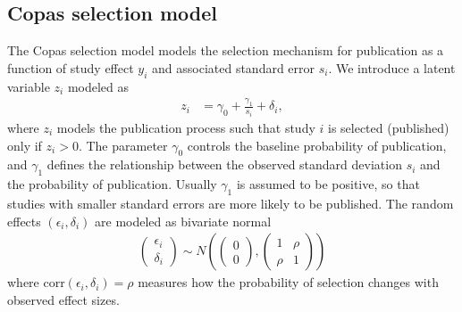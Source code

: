\documentclass[12pt]{article}   	%
\numberwithin{equation}{section}
\begin{document}

\subsection{Copas selection model} \label{sec:copas}

The Copas selection model \citep{copas1999what, copas2000funnel, copas2001sensitivity} models the selection mechanism for publication as a function of study effect $y_i$ and associated standard error $s_i$. We introduce a latent variable $z_i$ modeled as
\begin{align}
z_i &= \gamma_0 + \frac{\gamma_1}{s_i} + \delta_i, \label{eq:zi} 
\end{align}
where $z_i$ models the publication process such that study $i$ is selected (published) only if $z_i > 0$. The parameter $\gamma_0$ controls the baseline probability of publication, and $\gamma_1$ defines the relationship between the observed standard deviation $s_i$ and the probability of publication. Usually $\gamma_1$ is assumed to be positive, so that studies with smaller standard errors are more likely to be published. The random effects $(\epsilon_i, \delta_i)$ are modeled as bivariate normal
\begin{align}
\begin{pmatrix}
\epsilon_i \\
\delta_i
\end{pmatrix}\sim N\left(\begin{pmatrix}
0 \\
0
\end{pmatrix},\begin{pmatrix}
1 & \rho \\
\rho & 1
\end{pmatrix}\right) \label{eq:epsilon}
\end{align}
where corr$(\epsilon_i, \delta_i) = \rho$ measures how the probability of selection changes with observed effect sizes.
\end{document}
